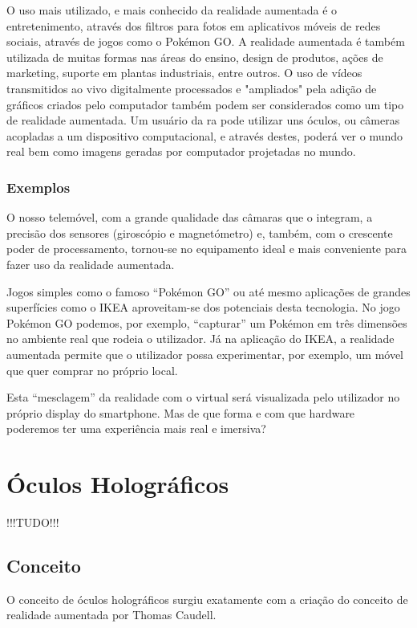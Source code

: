 \documentclass{report}
\begin{document}
O uso mais utilizado, e mais conhecido da realidade aumentada é o entretenimento, através dos filtros para fotos em aplicativos móveis de redes sociais, através de jogos como o Pokémon GO. A realidade aumentada é também utilizada de muitas formas nas áreas do ensino, design de produtos, ações de marketing, suporte em plantas industriais, entre outros. O uso de vídeos transmitidos ao vivo digitalmente processados e "ampliados" pela adição de gráficos criados pelo computador também podem ser considerados como um tipo de realidade aumentada. Um usuário da \ac{ra} pode utilizar uns óculos, ou câmeras acopladas a um dispositivo computacional, e através destes, poderá ver o mundo real bem como imagens geradas por computador projetadas no mundo.

\subsection{Exemplos}
O nosso telemóvel, com a grande qualidade das câmaras que o integram, a precisão dos sensores (giroscópio e magnetómetro) e, também, com o crescente poder de processamento, tornou-se no equipamento ideal e mais conveniente para fazer uso da realidade aumentada.

Jogos simples como o famoso “Pokémon GO” ou até mesmo aplicações de grandes superfícies como o IKEA aproveitam-se dos potenciais desta tecnologia. No jogo Pokémon GO podemos, por exemplo, “capturar” um Pokémon em três dimensões no ambiente real que rodeia o utilizador. Já na aplicação do IKEA, a realidade
aumentada permite que o utilizador possa experimentar, por exemplo, um móvel que quer comprar no próprio local.

Esta “mesclagem” da realidade com o virtual será visualizada pelo utilizador no próprio display do smartphone. Mas de que forma e com que hardware poderemos ter uma experiência mais real e imersiva?

\chapter{Óculos Holográficos}
\label{chap.oculos-holograficos}
!!!TUDO!!!

\section{Conceito}
O conceito de óculos holográficos surgiu exatamente com a criação do conceito de realidade aumentada por Thomas Caudell.
\end{document}
